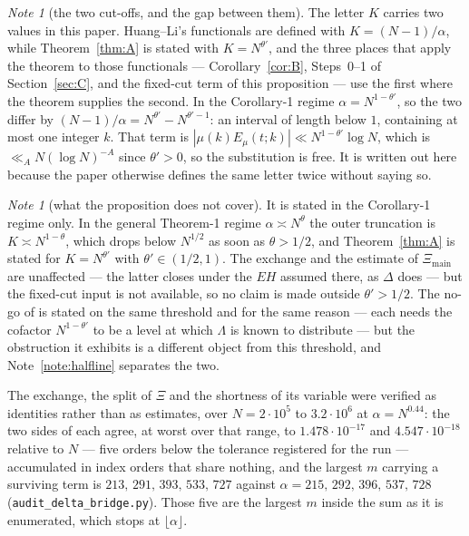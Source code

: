 \documentclass[11pt,a4paper]{article}
\theoremstyle{plain}
\theoremstyle{definition}
\theoremstyle{remark}
\newtheorem{note}[theorem]{Note}
\newcommand{\Emu}{E_\mu}
\begin{document}
\begin{note}[the two cut-offs, and the gap between them]
The letter $K$ carries two values in this paper. Huang--Li's
functionals are defined with $K=(N-1)/\alpha$, while
Theorem~\ref{thm:A} is stated with $K=N^{\theta'}$, and the three
places that apply the theorem to those functionals ---
Corollary~\ref{cor:B}, Steps~0--1 of Section~\ref{sec:C}, and the
fixed-cut term of this proposition --- use the first where the theorem
supplies the second. In the Corollary-1 regime $\alpha=N^{1-\theta'}$,
so the two differ by $(N-1)/\alpha=N^{\theta'}-N^{\theta'-1}$: an
interval of length below $1$, containing at most one integer $k$. That
term is $|\mu(k)\Emu(t;k)|\ll N^{1-\theta'}\log N$, which is
$\ll_AN(\log N)^{-A}$ since $\theta'>0$, so the substitution is free.
It is written out here because the paper otherwise defines the same
letter twice without saying so.
\end{note}

\begin{note}[what the proposition does not cover]
It is stated in the Corollary-1 regime only. In the general Theorem-1
regime $\alpha\asymp N^{\theta}$ the outer truncation is
$K\asymp N^{1-\theta}$, which drops below $N^{1/2}$ as soon as
$\theta>1/2$, and Theorem~\ref{thm:A} is stated for $K=N^{\theta'}$
with $\theta'\in(1/2,1)$. The exchange and the estimate of
$\Xi_{\mathrm{main}}$ are unaffected --- the latter closes under the
$EH$ assumed there, as $\Delta$ does --- but the fixed-cut input is not
available, so no claim is made outside $\theta'>1/2$. The no-go of
\cite{P2} is stated on the same threshold and for the same reason ---
each needs the cofactor $N^{1-\theta'}$ to be a level at which
$\Lambda$ is known to distribute --- but the obstruction it exhibits
is a different object from this threshold, and
Note~\ref{note:halfline} separates the two.
\end{note}

The exchange, the split of $\Xi$ and the shortness of its variable were
verified as identities rather than as estimates, over
$N=2\cdot10^5$ to $3.2\cdot10^6$ at $\alpha=N^{0.44}$: the two sides of
each agree, at worst over that range, to $1.478\cdot10^{-17}$ and
$4.547\cdot10^{-18}$ relative to $N$ --- five orders below the
tolerance registered for the run --- accumulated in index orders that
share nothing, and the largest
$m$ carrying a surviving term is $213,\,291,\,393,\,533,\,727$ against
$\alpha=215,\,292,\,396,\,537,\,728$
(\texttt{audit\_delta\_bridge.py}). Those five are the
largest $m$ inside the sum as it is enumerated, which stops at
$\lfloor\alpha\rfloor$.
\end{document}
